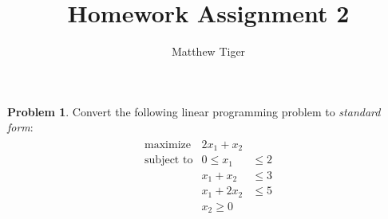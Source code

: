\documentclass[12pt]{article}
\title{Homework Assignment 2}
\author{Matthew Tiger}
\theoremstyle{definition}
\newtheorem{problem}{Problem}
\begin{document}
\maketitle


\begin{problem}
  Convert the following linear programming problem to \textit{standard form}:
  \begin{align*}
    \begin{array}{rll}
      \text{maximize} & 2x_1 + x_2 &\\
      \text{subject to} & 0 \leq x_1 &\leq 2 \\
      & x_1 + x_2 &\leq 3 \\
      & x_1 + 2x_2 &\leq 5 \\
      & x_2 \geq 0 &
    \end{array}
  \end{align*}
\end{problem}
\end{document}
